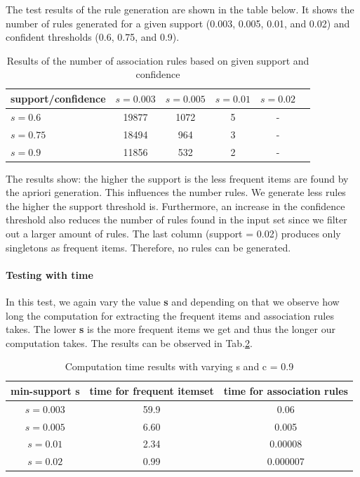 \documentclass[a4paper, 11pt]{article}
\begin{document}
The test results of the rule generation are shown in the table below. It shows the number of rules generated for a given support (0.003, 0.005, 0.01, and 0.02) and confident thresholds (0.6, 0.75, and  0.9).

\begin{table}[H]
	\centering
	\begin{tabular}{|l|c|c|c|c|c|} 
		\hline
		support/confidence &$s = 0.003$ &  $s = 0.005$ & $s = 0.01$ & $s = 0.02$  \\\hline
		$s=0.6$ &19877   &1072       &5& - \\
		$s=0.75$ &18494   &964       &3& -\\
		$s=0.9$ &11856    &532       &2&-\\
		\hline
	\end{tabular}
	\caption{Results of the number of association rules based on given support and confidence}
	\label{tab:results_h_2}
\end{table}

The results show: the higher the support is the less frequent items are found by the apriori generation. This influences the number rules. We generate less rules the higher the support threshold is. Furthermore, an increase in the confidence threshold also reduces the number of rules found in the input set since we filter out a larger amount of rules. The last column (support = 0.02) produces only singletons as frequent items. Therefore, no rules can be generated.

\paragraph{Testing with time}
In this test, we again vary the value \textbf{s} and depending on that we observe how long the computation for extracting the frequent items and association rules takes. The lower \textbf{s} is the more frequent items we get and thus the longer our computation takes. The results can be observed in Tab.\ref{tab:results_t}.
\begin{table}[H]
	\centering
	\begin{tabular}{|c|c|c|}
		\hline
		min-support  s & time for frequent itemset & time for association rules\\\hline
		$s=0.003$ & 59.9 & 0.06\\
		$s=0.005$ & 6.60 & 0.005 \\
		$s=0.01$ & 2.34 &  0.00008 \\
		$s=0.02$ & 0.99  &  0.000007\\
		\hline
	\end{tabular}
	\caption{Computation time results with varying s and c = 0.9}
	\label{tab:results_t}
\end{table}
\end{document}
